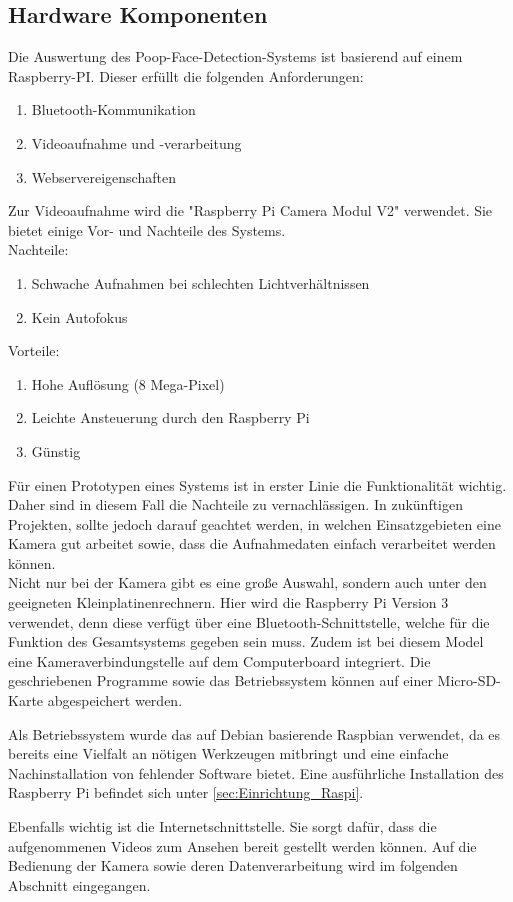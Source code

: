 \subsection{Hardware Komponenten}
\label{subsec:evalsys_hardware}

Die Auswertung des Poop-Face-Detection-Systems ist basierend auf einem Raspberry-PI. Dieser erfüllt die folgenden Anforderungen:

\begin{enumerate}
\item Bluetooth-Kommunikation
\item Videoaufnahme und -verarbeitung
\item Webservereigenschaften
\end{enumerate}

Zur Videoaufnahme wird die "Raspberry Pi Camera Modul V2" verwendet. Sie bietet einige Vor- und Nachteile des Systems. \\

Nachteile:
\begin{enumerate}
\item Schwache Aufnahmen bei schlechten Lichtverhältnissen
\item Kein Autofokus
\end{enumerate}
\vspace{0.35cm}

Vorteile:
\begin{enumerate}
\item Hohe Auflösung (8 Mega-Pixel)
\item Leichte Ansteuerung durch den Raspberry Pi
\item Günstig
\end{enumerate}

Für einen Prototypen eines Systems ist in erster Linie die Funktionalität wichtig. Daher sind in diesem Fall die Nachteile zu vernachlässigen. In zukünftigen Projekten, sollte jedoch darauf geachtet werden, in welchen Einsatzgebieten eine Kamera gut arbeitet sowie, dass die Aufnahmedaten einfach verarbeitet werden können.\cite{picam_webseite} \\

Nicht nur bei der Kamera gibt es eine große Auswahl, sondern auch unter den geeigneten Kleinplatinenrechnern. Hier wird die Raspberry Pi Version 3 verwendet, denn diese verfügt über eine Bluetooth-Schnittstelle, welche für die Funktion des Gesamtsystems gegeben sein muss. Zudem ist bei diesem Model eine Kameraverbindungstelle auf dem Computerboard integriert. Die geschriebenen Programme sowie das Betriebssystem können auf einer Micro-SD-Karte abgespeichert werden.\cite{raspi_datenblatt}

Als Betriebssystem wurde das auf Debian basierende Raspbian verwendet, da es bereits eine Vielfalt an nötigen Werkzeugen mitbringt und eine einfache Nachinstallation von fehlender Software bietet. Eine ausführliche Installation des Raspberry Pi befindet sich unter \ref{sec:Einrichtung_Raspi}.

Ebenfalls wichtig ist die Internetschnittstelle. Sie sorgt dafür, dass die aufgenommenen Videos zum Ansehen bereit gestellt werden können. Auf die Bedienung der Kamera sowie deren Datenverarbeitung wird im folgenden Abschnitt eingegangen.
